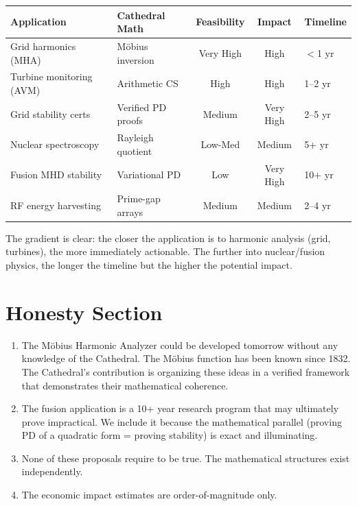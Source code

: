 \documentclass[11pt,a4paper]{article}
\begin{document}
\begin{center}
\small
\begin{tabular}{@{}llccl@{}}
\toprule
\textbf{Application} & \textbf{Cathedral Math} &
\textbf{Feasibility} & \textbf{Impact} & \textbf{Timeline} \\
\midrule
Grid harmonics (MHA) & M\"obius inversion & Very High & High & $<$1 yr \\
Turbine monitoring (AVM) & Arithmetic CS & High & High & 1--2 yr \\
Grid stability certs & Verified PD proofs & Medium & Very High & 2--5 yr \\
Nuclear spectroscopy & Rayleigh quotient & Low-Med & Medium & 5+ yr \\
Fusion MHD stability & Variational PD & Low & Very High & 10+ yr \\
RF energy harvesting & Prime-gap arrays & Medium & Medium & 2--4 yr \\
\bottomrule
\end{tabular}
\end{center}

The gradient is clear: the closer the application is to harmonic
analysis (grid, turbines), the more immediately actionable. The
further into nuclear/fusion physics, the longer the timeline but
the higher the potential impact.

\section{Honesty Section}

\begin{enumerate}
  \item The M\"obius Harmonic Analyzer could be developed tomorrow
    without any knowledge of the Cathedral. The M\"obius function
    has been known since 1832. The Cathedral's contribution is
    organizing these ideas in a verified framework that demonstrates
    their mathematical coherence.
  \item The fusion application is a 10+ year research program that
    may ultimately prove impractical. We include it because the
    mathematical parallel (proving PD of a quadratic form = proving
    stability) is exact and illuminating.
  \item None of these proposals require \RH{} to be true. The
    mathematical structures exist independently.
  \item The economic impact estimates are order-of-magnitude only.
\end{enumerate}
\end{document}
